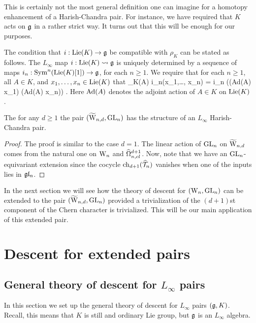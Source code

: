 \documentclass[10pt]{amsart}
\begin{document}
\begin{rmk} 
This is certainly not the most general definition one can imagine for a homotopy enhancement of a Harish-Chandra pair. 
For instance, we have required that $K$ acts on $\mathfrak g$ in a rather strict way. 
It turns out that this will be enough for our purposes.
\end{rmk}

The condition that $i : {\rm Lie}(K) \to \mathfrak g$ be compatible with $\rho_K$ can be stated as follows. 
The $L_\infty$ map $i : {\rm Lie}(K) \rightsquigarrow \mathfrak g$ is uniquely determined by a sequence of maps $i_n : {\rm Sym}^n({\rm Lie}(K)[1]) \to \mathfrak g$, for each $n \geq 1$. 
We require that for each $n \geq 1$, all $A \in K$, and $x_1,\ldots, x_n \in {\rm Lie}(K)$ that
\ben
\rho_K(A) \cdot i_n(x_1,\ldots, x_n) = i_n \left(\left({\rm Ad}(A) \cdot x_{1}\right) \cdots  \left({\rm Ad}(A) \cdot x_{n}\right)\right) .
\een 
Here ${\rm Ad}(A)$ denotes the adjoint action of $A \in K$ on ${\rm Lie}(K)$. 

\begin{lem} The for any $d \geq 1$ the pair $(\widetilde{\rm W}_{n,d}, {\rm GL}_n)$ has the structure of an $L_\infty$ Harish-Chandra pair.
\end{lem}
\begin{proof}
The proof is similar to the case $d=1$. 
The linear action of ${\rm GL}_n$ on $\widetilde{\rm W}_{n,d}$ comes from the natural one on ${{\rm W}_n}$ and $\widehat{\Omega}^{d+1}_{n,cl}$. 
Now, note that we have an ${\rm GL}_n$-equivariant extension
\ben
{}
\een
since the cocycle ${\rm ch}_{d+1}(\widehat{\mathcal T}_n)$ vanishes when one of the inputs lies in $\mathfrak{g} \mathfrak{l}_n$. 
\end{proof}

In the next section we will see how the theory of descent for $({{\rm W}_n}, {\rm GL}_n)$ can be extended to the pair $(\widetilde{\rm W}_{n,d}, {\rm GL}_n)$ provided a trivialization of the $(d+1)$st component of the Chern character is trivialized. 
This will be our main application of this extended pair. 

\section{Descent for extended pairs}

\subsection{General theory of descent for $L_\infty$ pairs}

In this section we set up the general theory of descent for $L_\infty$ pairs $(\mathfrak g,K)$.
Recall, this means that $K$ is still and ordinary Lie group, but $\mathfrak g$ is an $L_\infty$ algebra. 
\end{document}
